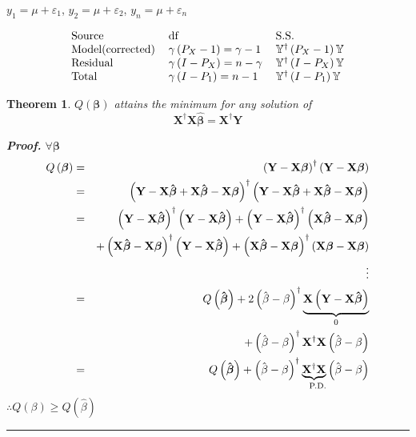 \documentclass{article}
\newtheorem{theorem}{Theorem}
\newenvironment{proof}[1][Proof]{\noindent\textbf{#1.} }{\ \rule{0.5em}{0.5em}}
\begin{document}
\bigskip

$y_{1}=\mu +\varepsilon _{1}$, $y_{2}=\mu +\varepsilon _{2}$, $y_{n}=\mu
+\varepsilon _{n}$

\begin{equation*}
\begin{tabular}{lll}
Source & df & S.S. \\ 
Model(corrected) & $\gamma \left( P_{X}-1\right) =\gamma -1$ & $\mathbb{Y}%
^{\dagger }\left( P_{X}-1\right) \mathbb{Y}$ \\ 
Residual & $\gamma \left( I-P_{X}\right) =n-\gamma $ & $\mathbb{Y}^{\dagger
}\left( I-P_{X}\right) \mathbb{Y}$ \\ 
Total & $\gamma \left( I-P_{1}\right) =n-1$ & $\mathbb{Y}^{\dagger }\left(
I-P_{1}\right) \mathbb{Y}$%
\end{tabular}%
\end{equation*}

\begin{theorem}
$Q\left( \mathbf{\beta }\right) $ attains the minimum for any solution of%
\begin{equation*}
\mathbf{X}^{\dagger }\mathbf{X\hat{\beta}}=\mathbf{X}^{\mathbb{\dagger }}%
\mathbf{Y}
\end{equation*}

\begin{proof}
$\forall \mathbf{\beta }$%
\begin{eqnarray*}
Q\left( \mathbf{\beta }\right)  &=&\left( \mathbf{Y-X\beta }\right)
^{\dagger }\left( \mathbf{Y-X\beta }\right)  \\
&=&\left( \mathbf{Y-X\hat{\beta}+X\hat{\beta}-X\beta }\right) ^{\dagger
}\left( \mathbf{Y-X\hat{\beta}+X\hat{\beta}-X\beta }\right)  \\
&=&\left( \mathbf{Y-X\hat{\beta}}\right) ^{\dagger }\left( \mathbf{Y-X\hat{%
\beta}}\right) +\left( \mathbf{Y-X\hat{\beta}}\right) ^{\dagger }\left( 
\mathbf{X\hat{\beta}-X\beta }\right)  \\
&&+\left( \mathbf{X\hat{\beta}-X\beta }\right) ^{\dagger }\left( \mathbf{Y-X%
\hat{\beta}}\right) +\left( \mathbf{X\hat{\beta}-X\beta }\right) ^{\dagger
}\left( \mathbf{X\beta -X\beta }\right)  \\
&&\vdots  \\
&=&Q\left( \mathbf{\hat{\beta}}\right) +2\left( \hat{\beta}-\beta \right)
^{\dagger }\underset{0}{\underbrace{\mathbf{X}\left( \mathbf{Y-X\hat{\beta}}%
\right) }} \\
&&+\left( \hat{\beta}-\beta \right) ^{\dagger }\mathbf{X}^{\dagger }\mathbf{X%
}\left( \hat{\beta}-\beta \right)  \\
&=&Q\left( \mathbf{\hat{\beta}}\right) +\left( \hat{\beta}-\beta \right)
^{\dagger }\underset{\text{P.D.}}{\underbrace{\mathbf{X}^{\dagger }\mathbf{X}%
}}\left( \hat{\beta}-\beta \right) 
\end{eqnarray*}%
$\therefore Q\left( \beta \right) \geq Q\left( \hat{\beta}\right) $
\end{proof}
\end{theorem}
\end{document}
